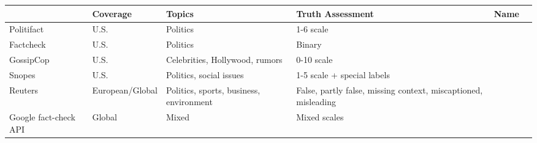 \begin{tabular}{p{1.8cm}|p{1.8cm}|p{3cm}|p{3cm}}
\toprule{} &         Coverage &                                   Topics &                                                 Truth Assessment & Name &                                          &                                                                 \\
\midrule
Politifact            &             U.S. &                                 Politics &                                                       1-6 scale \\
Factcheck             &             U.S. &                                 Politics &                                                          Binary \\
GossipCop             &            U.S.  &           Celebrities, Hollywood, rumors &                                                      0-10 scale \\
Snopes                &             U.S. &                  Politics, social issues &                                      1-5 scale + special labels \\
Reuters               &  European/Global &  Politics, sports, business, environment &  False, partly false, missing context, miscaptioned, misleading \\
Google fact-check API &           Global &                                    Mixed &                                                    Mixed scales \\
\bottomrule
\end{tabular}
